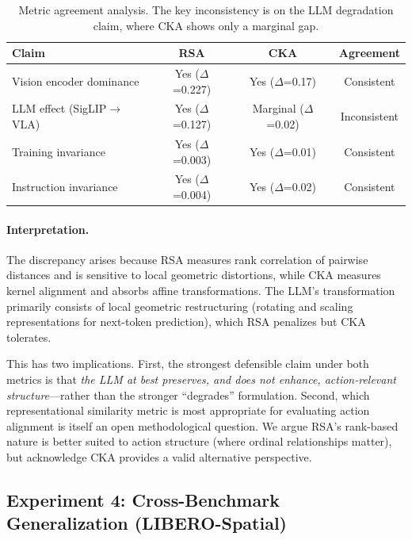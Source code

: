 \documentclass[letterpaper]{article}
\begin{document}
\begin{table}[t]
\centering
\caption{Metric agreement analysis. The key inconsistency is on the LLM degradation claim, where CKA shows only a marginal gap.}
\label{tab:metric_agreement}
\small
\begin{tabular}{lccc}
\toprule
\textbf{Claim} & \textbf{RSA} & \textbf{CKA} & \textbf{Agreement} \\
\midrule
Vision encoder dominance & Yes ($\Delta$=0.227) & Yes ($\Delta$=0.17) & Consistent \\
LLM effect (SigLIP$\to$VLA) & Yes ($\Delta$=0.127) & Marginal ($\Delta$=0.02) & Inconsistent \\
Training invariance & Yes ($\Delta$=0.003) & Yes ($\Delta$=0.01) & Consistent \\
Instruction invariance & Yes ($\Delta$=0.004) & Yes ($\Delta$=0.02) & Consistent \\
\bottomrule
\end{tabular}
\end{table}

\paragraph{Interpretation.}
The discrepancy arises because RSA measures rank correlation of pairwise distances and is sensitive to local geometric distortions, while CKA measures kernel alignment and absorbs affine transformations.
The LLM's transformation primarily consists of local geometric restructuring (rotating and scaling representations for next-token prediction), which RSA penalizes but CKA tolerates.

This has two implications.
First, the strongest defensible claim under both metrics is that \emph{the LLM at best preserves, and does not enhance, action-relevant structure}---rather than the stronger ``degrades'' formulation.
Second, which representational similarity metric is most appropriate for evaluating action alignment is itself an open methodological question.
We argue RSA's rank-based nature is better suited to action structure (where ordinal relationships matter), but acknowledge CKA provides a valid alternative perspective.


\subsection{Experiment 4: Cross-Benchmark Generalization (LIBERO-Spatial)}
\label{sec:exp4}
\end{document}
